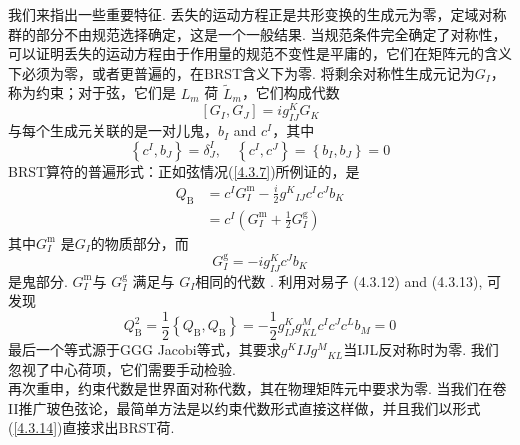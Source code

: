 我们来指出一些重要特征. 丢失的运动方程正是共形变换的生成元为零，定域对称群的部分不由规范选择确定，这是一个一般结果. 当规范条件完全确定了对称性，可以证明丢失的运动方程由于作用量的规范不变性是平庸的，它们在矩阵元的含义下必须为零，或者更普遍的，在BRST含义下为零. 将剩余对称性生成元记为$G_{I}$，称为约束；对于弦，它们是 $L_{m}$ 荷 $\tilde{L}_{m} $，它们构成代数
\begin{equation}\label{4.3.12}
\left[G_{I}, G_{J}\right]=i g_{I J}^{K} G_{K}
\end{equation}
与每个生成元关联的是一对儿鬼，$b_{I}$ and $c^{I}$，其中
\begin{equation}\label{4.3.13}
\left\{c^{I}, b_{J}\right\}=\delta_{J}^{I}, \quad\left\{c^{I}, c^{J}\right\}=\left\{b_{I}, b_{J}\right\}=0
\end{equation}
BRST算符的普遍形式：正如弦情况(\ref{4.3.7})所例证的，是
\begin{equation}\label{4.3.14}
\begin{aligned}
Q_{\mathrm{B}} &=c^{I} G_{I}^{\mathrm{m}}-\frac{i}{2} g^{K}{ }_{I J} c^{I} c^{J} b_{K} \\
&=c^{I}\left(G_{I}^{\mathrm{m}}+\frac{1}{2} G_{I}^{\mathrm{g}}\right)
\end{aligned}
\end{equation}
其中$G_{I}^{\mathrm{m}}$ 是$G_{I}$的物质部分，而
\begin{equation}
G_{I}^{\mathrm{g}}=-i g_{I J}^{K} c^{J} b_{K}
\end{equation}
是鬼部分. $G_{I}^{\mathrm{m}}$与 $G_{I}^{\mathrm{g}}$ 满足与 $G_{I}$相同的代数 . 利用对易子 (4.3.12) and (4.3.13), 可发现
\begin{equation}
Q_{\mathrm{B}}^{2}=\frac{1}{2}\left\{Q_{\mathrm{B}}, Q_{\mathrm{B}}\right\}=-\frac{1}{2} g_{I J}^{K} g_{K L}^{M} c^{I} c^{J} c^{L} b_{M}=0
\end{equation}
最后一个等式源于GGG Jacobi等式，其要求$g^{K}{I J} g^{M}{ }_{K L}$当IJL反对称时为零. 
我们忽视了中心荷项，它们需要手动检验.\\
再次重申，约束代数是世界面对称代数，其在物理矩阵元中要求为零. 当我们在卷II推广玻色弦论，最简单方法是以约束代数形式直接这样做，并且我们以形式(\ref{4.3.14})直接求出BRST荷.\\


